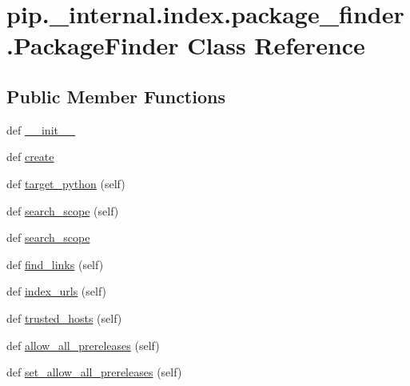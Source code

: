 \hypertarget{classpip_1_1__internal_1_1index_1_1package__finder_1_1PackageFinder}{}\section{pip.\+\_\+internal.\+index.\+package\+\_\+finder.\+Package\+Finder Class Reference}
\label{classpip_1_1__internal_1_1index_1_1package__finder_1_1PackageFinder}
\subsection*{Public Member Functions}
\begin{DoxyCompactItemize}
\item 
def \hyperlink{classpip_1_1__internal_1_1index_1_1package__finder_1_1PackageFinder_ac96e00cb99a6b8edddea715835d68269}{\+\_\+\+\_\+init\+\_\+\+\_\+}
\item 
def \hyperlink{classpip_1_1__internal_1_1index_1_1package__finder_1_1PackageFinder_a59167241c833962aac9af1009edf04a2}{create}
\item 
def \hyperlink{classpip_1_1__internal_1_1index_1_1package__finder_1_1PackageFinder_a6e1939ad09cd26e5853c5beb343d90e9}{target\+\_\+python} (self)
\item 
def \hyperlink{classpip_1_1__internal_1_1index_1_1package__finder_1_1PackageFinder_a69659b6f159a453bb4bb672c379d875f}{search\+\_\+scope} (self)
\item 
def \hyperlink{classpip_1_1__internal_1_1index_1_1package__finder_1_1PackageFinder_a7ca43190ea09fe20c0acf171a5a7c166}{search\+\_\+scope}
\item 
def \hyperlink{classpip_1_1__internal_1_1index_1_1package__finder_1_1PackageFinder_a4b299bc61fedd8945796b5de61d0e305}{find\+\_\+links} (self)
\item 
def \hyperlink{classpip_1_1__internal_1_1index_1_1package__finder_1_1PackageFinder_a322b4e91dd50f409c6b9b9364a4ad510}{index\+\_\+urls} (self)
\item 
def \hyperlink{classpip_1_1__internal_1_1index_1_1package__finder_1_1PackageFinder_a941aa7758f1096c1ecb2da9bb302e6c4}{trusted\+\_\+hosts} (self)
\item 
def \hyperlink{classpip_1_1__internal_1_1index_1_1package__finder_1_1PackageFinder_a739d3692eef7f428e82c0d3ffa680562}{allow\+\_\+all\+\_\+prereleases} (self)
\item 
def \hyperlink{classpip_1_1__internal_1_1index_1_1package__finder_1_1PackageFinder_a3a3adcb282cd15929fa2f555169220b0}{set\+\_\+allow\+\_\+all\+\_\+prereleases} (self)

\end{DoxyCompactItemize}
